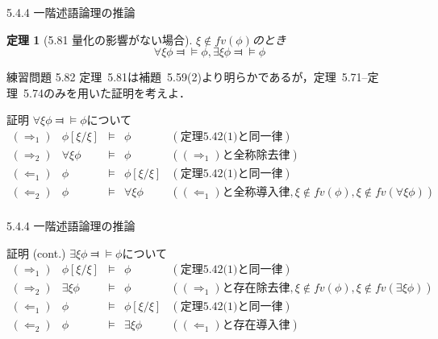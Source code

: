 \documentclass[dvipdfmx,11pt]{beamer}
\newtheorem{theo}[theorem]{定理}
\begin{document}
\begin{frame}{5.4.4 一階述語論理の推論}
  \begin{theo}[5.81 量化の影響がない場合]
    \(\xi \not \in \textit{fv}(\phi)\)のとき
    \[
    \forall \xi \phi \Dashv \vDash \phi, \exists \xi \phi \Dashv \vDash \phi
    \]
  \end{theo}
  \begin{block}{練習問題 5.82}
    定理~5.81は補題~5.59(2)より明らかであるが，定理~5.71--定理~5.74のみを用いた証明を考えよ．
  \end{block}
  \begin{block}{証明}
    \(\forall \xi \phi \Dashv \vDash \phi\)について
    \[
    \begin{array}{rrcll}
      (\Rightarrow_1) & \phi [ \xi / \xi ] & \vDash & \phi & (\textit{定理5.42(1)と同一律}) \\
      (\Rightarrow_2) & \forall \xi \phi & \vDash & \phi & ((\Rightarrow_1)\textit{と全称除去律}) \\
      (\Leftarrow_1) & \phi & \vDash & \phi [ \xi / \xi ] & (\textit{定理5.42(1)と同一律}) \\
      (\Leftarrow_2) & \phi & \vDash & \forall \xi \phi & ((\Leftarrow_1)\textit{と全称導入律}, \xi \not \in \textit{fv}(\phi), \xi \not \in \textit{fv}(\forall\xi\phi)) \\
    \end{array}
    \]
  \end{block}
\end{frame}

\begin{frame}{5.4.4 一階述語論理の推論}
  \begin{block}{証明 (cont.)}
    \(\exists \xi \phi \Dashv \vDash \phi\)について
    \[
    \begin{array}{rrcll}
      (\Rightarrow_1) & \phi [ \xi / \xi ] & \vDash & \phi & (\textit{定理5.42(1)と同一律}) \\
      (\Rightarrow_2) & \exists \xi \phi & \vDash & \phi & ((\Rightarrow_1)\textit{と存在除去律}, \xi \not \in \textit{fv}(\phi), \xi \not \in \textit{fv}(\exists\xi\phi)) \\
      (\Leftarrow_1) & \phi & \vDash & \phi [ \xi / \xi ] & (\textit{定理5.42(1)と同一律}) \\
      (\Leftarrow_2) & \phi & \vDash & \exists \xi \phi & ((\Leftarrow_1)\textit{と存在導入律}) \\
    \end{array}
    \]
  \end{block}
\end{frame}
\end{document}
